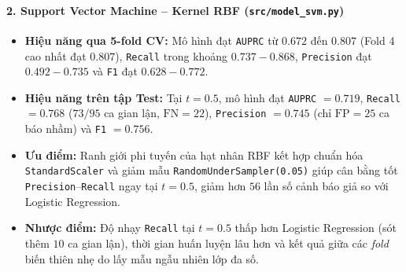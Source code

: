 \paragraph{2. Support Vector Machine -- Kernel RBF (\texttt{src/model\_svm.py})}\mbox{}
\begin{itemize}
    \item \textbf{Hiệu năng qua 5-fold CV:} Mô hình đạt \texttt{AUPRC} từ $0.672$ đến $0.807$ (Fold 4 cao nhất đạt $0.807$), \texttt{Recall} trong khoảng $0.737 - 0.868$, \texttt{Precision} đạt $0.492 - 0.735$ và \texttt{F1} đạt $0.628 - 0.772$.
    \item \textbf{Hiệu năng trên tập Test:} Tại $t = 0.5$, mô hình đạt \texttt{AUPRC} $= 0.719$, \texttt{Recall} $= 0.768$ ($73/95$ ca gian lận, $\text{FN} = 22$), \texttt{Precision} $= 0.745$ (chỉ $\text{FP} = 25$ ca báo nhầm) và \texttt{F1} $= 0.756$.
    \item \textbf{Ưu điểm:} Ranh giới phi tuyến của hạt nhân RBF kết hợp chuẩn hóa \texttt{StandardScaler} và giảm mẫu \texttt{RandomUnderSampler(0.05)} giúp cân bằng tốt \texttt{Precision}--\texttt{Recall} ngay tại $t = 0.5$, giảm hơn $56$ lần số cảnh báo giả so với Logistic Regression.
    \item \textbf{Nhược điểm:} Độ nhạy \texttt{Recall} tại $t = 0.5$ thấp hơn Logistic Regression (sót thêm $10$ ca gian lận), thời gian huấn luyện lâu hơn và kết quả giữa các \textit{fold} biến thiên nhẹ do lấy mẫu ngẫu nhiên lớp đa số.
\end{itemize}

